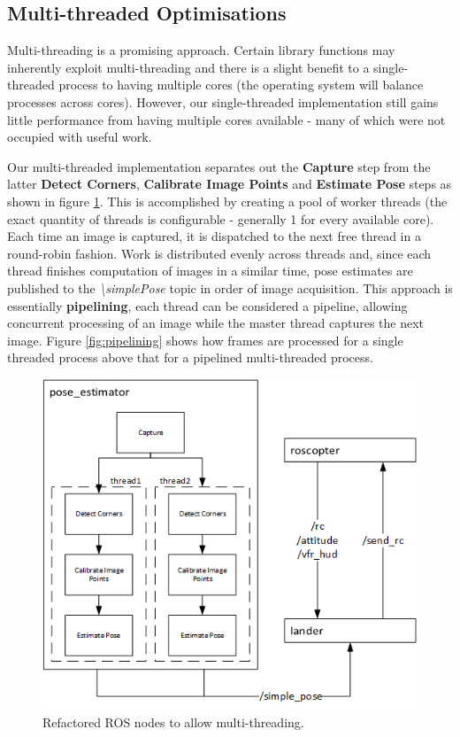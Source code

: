 \documentclass{acm_proc_article-sp}
\begin{document}
\subsection{Multi-threaded Optimisations}
Multi-threading is a promising approach. Certain library functions may inherently exploit multi-threading and there is a slight benefit to a single-threaded process to having multiple cores (the operating system will balance processes across cores). However, our single-threaded implementation still gains little performance from having multiple cores available - many of which were not occupied with useful work. 

Our multi-threaded implementation separates out the \textbf{Capture} step from the latter \textbf{Detect Corners}, \textbf{Calibrate Image Points} and \textbf{Estimate Pose} steps as shown in figure \ref{fig:flowchart-multi}. This is accomplished by creating a pool of worker threads (the exact quantity of threads is configurable - generally 1 for every available core). Each time an image is captured, it is dispatched to the next free thread in a round-robin fashion. Work is distributed evenly across threads and, since each thread finishes computation of images in a similar time, pose estimates are published to the \textit{\textbackslash simplePose} topic in order of image acquisition.  This approach is essentially \textbf{pipelining}, each thread can be considered a pipeline, allowing concurrent processing of an image while the master thread captures the next image.  Figure \ref{fig:pipelining} shows how frames are processed for a single threaded process above that for a pipelined multi-threaded process.

\begin{figure}[ht!]
    \centering
    \includegraphics[width=\linewidth]{images/flowchart-plain-multi-threaded.png}
    \caption{Refactored ROS nodes to allow multi-threading.}
    \label{fig:flowchart-multi}
\end{figure}
\end{document}
